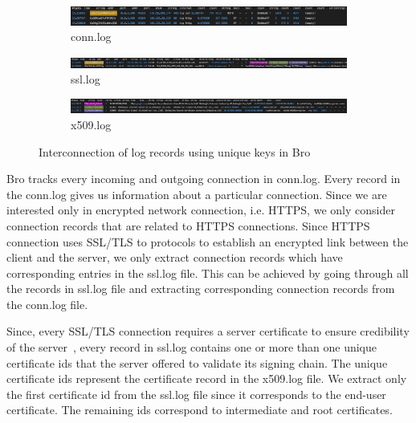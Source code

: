 \begin{figure}[htb]
	\begin{center}
		\begin{subfigure}{1\textwidth}
			\includegraphics[width=1\textwidth]{images/conn-log.png} 
			\caption{conn.log}
			
			\vspace{0.4cm}
			
		\end{subfigure}
		\begin{subfigure}{1\textwidth}
			\includegraphics[width=1\textwidth]{images/ssl-log.png} 
			\caption{ssl.log}
			
			\vspace{0.4cm}
			
		\end{subfigure}
		\begin{subfigure}{1\textwidth}
			\includegraphics[width=1\textwidth]{images/x509-log.png}
			\caption{x509.log}
		\end{subfigure}
	\end{center}
	\caption{Interconnection of log records using unique keys in Bro} 
	\label{fig:interconnection}
\end{figure}

Bro tracks every incoming and outgoing connection in conn.log. Every record in the conn.log gives us information about a particular connection. Since we are interested only in encrypted network connection, i.e. HTTPS, we only consider connection records that are related to HTTPS connections. Since HTTPS connection uses SSL/TLS to protocols to establish an encrypted link between the client and the server, we only extract connection records which have corresponding entries in the ssl.log file. This can be achieved by going through all the records in ssl.log file and extracting corresponding connection records from the conn.log file.

Since, every SSL/TLS connection requires a server certificate to ensure credibility of the server~\cite{RFC1601}, every record in ssl.log contains one or more than one unique certificate ids that the server offered to validate its signing chain. The unique certificate ids represent the certificate record in the x509.log file. We extract only the first certificate id from the ssl.log file since it corresponds to the end-user certificate. The remaining ids correspond to intermediate and root certificates.

